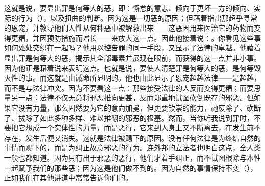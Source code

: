 这就是说，要显出罪是何等大的恶，即：懈怠的意志、倾向于更坏一方的倾向、实际的行为（），以及扭曲的判断。因为这是一切恶的原因；但藉着指出那超乎寻常的恩宠，并教导他们人性从何种恶中被解救出来——这恶因用来医治它的药物而变得更糟，并因预防措施而增长——来放大这一点。因此他接着说：。你看见这些事如何处处交织在一起吗？他用以控告罪的同一手段，又显示了法律的卓越。他藉着显出罪是何等大的恶，揭示其全部毒素并展现在眼前，而获得的这一点并非小事。因为他正是藉着说来表明这点。也就是说，要使人清楚罪是何等大的恶，是何等毁灭性的事。而这就是由诫命所显明的。他也由此显示了恩宠超越法律——是超越，而不是与法律冲突。因为不要看这一点：那些接受法律的人反而变得更糟；而要思量另一点：法律不仅无意将邪恶推向更甚，反而郑重地试图砍倒既存的邪恶。但如果它没有力量，那么固然要为它的意向加冕，但更要钦崇的能力，祂废除了、砍断了、拔除了如此多种多样、难以推翻的邪恶的根基。然而，当你听我说到罪时，不要把它想成一个实体性的力量，而是恶行，它来到人身上又不断离去，在发生前不存在，发生后便又消失。这就是法律被赐下的原因。没有任何法律是为终结自然的事情而赐下的，而是为纠正故意邪恶的行为。连外邦的立法者也明白这点，全人类一般也都知道。因为只有出于邪恶的恶行，他们才着手纠正，而不试图根除与本性一起赋予我们的那些恶；因为这是他们做不到的。因为自然的事情保持不变（），正如我们在其他讲道中常常告诉你们的。\par

